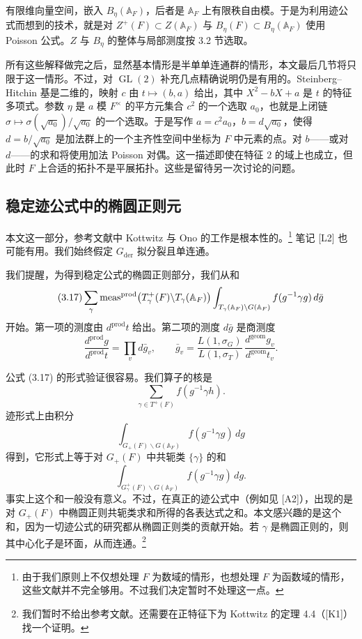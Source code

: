 有限维向量空间，嵌入 $B_\eta(\mathbb A_F)$，后者是 $\mathbb A_F$ 上有限秩自由模。于是为利用迹公式而想到的技术，就是对 $Z^+(F)\subset Z(\mathbb A_F)$ 与 $B_\eta(F)\subset B_\eta(\mathbb A_F)$ 使用 Poisson 公式。$Z$ 与 $B_\eta$ 的整体与局部测度按 3.2 节选取。

所有这些解释做完之后，显然基本情形是半单单连通群的情形，本文最后几节将只限于这一情形。不过，对 $\operatorname{GL}(2)$ 补充几点精确说明仍是有用的。Steinberg–Hitchin 基是二维的，映射 $c$ 由 $t\mapsto(b,a)$ 给出，其中 $X^2-bX+a$ 是 $t$ 的特征多项式。参数 $\eta$ 是 $a$ 模 $F^\times$ 的平方元集合 $c^2$ 的一个选取 $a_0$，也就是上闭链 $\sigma\mapsto\sigma(\sqrt{a_0})/\sqrt{a_0}$ 的一个选取。于是写作 $a=c^2a_0$，$b=d\sqrt{a_0}$，使得 $d=b/\sqrt{a_0}$ 是加法群上的一个主齐性空间中坐标为 $F$ 中元素的点。对 $b$——或对 $d$——的求和将使用加法 Poisson 对偶。这一描述即使在特征 $2$ 的域上也成立，但此时 $F$ 上合适的拓扑不是平展拓扑。这些是留待另一次讨论的问题。

\subsection{稳定迹公式中的椭圆正则元}

本文这一部分，参考文献中 Kottwitz 与 Ono 的工作是根本性的。\footnote{由于我们原则上不仅想处理 $F$ 为数域的情形，也想处理 $F$ 为函数域的情形，这些文献并不完全够用。不过我们决定暂时不处理这一点。} 笔记 [L2] 也可能有用。我们始终假定 $G_{\mathrm{der}}$ 拟分裂且单连通。

我们提醒，为得到稳定公式的椭圆正则部分，我们从和
\begin{equation}\tag{3.17}
\sum_\gamma\operatorname{meas}^{\mathrm{prod}}\bigl(T^+_\gamma(F)\backslash T_\gamma(\mathbb A_F)\bigr)
\int_{T_\gamma(\mathbb A_F)\backslash G(\mathbb A_F)}f(g^{-1}\gamma g)\,d\bar g
\end{equation}
开始。第一项的测度由 $d^{\mathrm{prod}}t$ 给出。第二项的测度 $d\bar g$ 是商测度
\[
\frac{d^{\mathrm{prod}}g}{d^{\mathrm{prod}}t}=\prod_vd\bar g_v,
\qquad
\bar g_v=\frac{L(1,\sigma_G)}{L(1,\sigma_T)}\,\frac{d^{\mathrm{geom}}g_v}{d^{\mathrm{geom}}t_v}.
\]

公式 (3.17) 的形式验证很容易。我们算子的核是
\[
\sum_{\gamma\in T^+(F)}f(g^{-1}\gamma h).
\]
迹形式上由积分
\[
\int_{G_+(F)\backslash G(\mathbb A_F)}f(g^{-1}\gamma g)\,dg
\]
得到，它形式上等于对 $G_+(F)$ 中共轭类 $\{\gamma\}$ 的和
\begin{equation}\tag{3.18}
\int_{G^+_\gamma(F)\backslash G(\mathbb A_F)}f(g^{-1}\gamma g)\,dg.
\end{equation}
事实上这个和一般没有意义。不过，在真正的迹公式中（例如见 [A2]），出现的是对 $G_+(F)$ 中椭圆正则共轭类求和所得的各表达式之和。本文感兴趣的是这个和，因为一切迹公式的研究都从椭圆正则类的贡献开始。若 $\gamma$ 是椭圆正则的，则其中心化子是环面，从而连通。\footnote{我们暂时不给出参考文献。还需要在正特征下为 Kottwitz 的定理 4.4（[K1]）找一个证明。}

